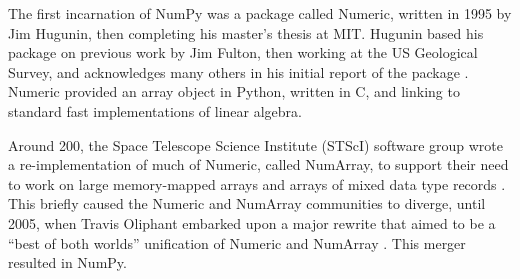 

The first incarnation of NumPy was a package called Numeric, written in 1995
by Jim Hugunin, then completing his master's thesis at MIT.
Hugunin based his package on previous work by Jim Fulton,
then working at the US Geological Survey, and acknowledges
many others in his initial report of the package \cite{Hugunin-whitepaper}.
Numeric provided an array object in Python, written in C, and linking to
standard fast implementations of linear algebra.




Around 200, the Space Telescope Science Institute (STScI) software group wrote
a re-implementation of much of Numeric, called NumArray, to support their
need to work on large memory-mapped arrays and arrays of mixed data type
records \cite{STScI-slither}.
This briefly caused the Numeric and NumArray communities to diverge, until 2005,
when Travis Oliphant embarked upon a major rewrite that aimed to be a ``best of
both worlds'' unification of Numeric and NumArray \cite{oliphant2006guide}.
This merger resulted in NumPy.

